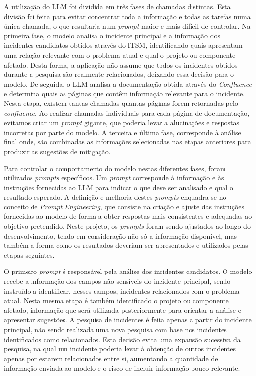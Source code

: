 		A utilização do \gls{LLM} foi dividida em três fases de chamadas distintas. Esta divisão foi feita para evitar concentrar toda a informação e todas as tarefas numa única chamada, o que resultaria num \textit{prompt} maior e mais difícil de controlar. Na primeira fase, o modelo analisa o incidente principal e a informação dos incidentes candidatos obtidos através do \gls{ITSM}, identificando quais apresentam uma relação relevante com o problema atual e qual o projeto ou componente afetado. Desta forma, a aplicação não assume que todos os incidentes obtidos durante a pesquisa são realmente relacionados, deixando essa decisão para o modelo. De seguida, o \gls{LLM} analisa a documentação obtida através do \textit{Confluence} e determina quais as páginas que contêm informação relevante para o incidente. Nesta etapa, existem tantas chamadas quantas páginas forem retornadas pelo \textit{confluence}. Ao realizar chamadas individuais para cada página de documentação, evitamos criar um \textit{prompt} gigante, que poderia levar a alucinações e respostas incorretas por parte do modelo. A terceira e última fase, corresponde à análise final onde, são combinadas as informações selecionadas nas etapas anteriores para produzir as sugestões de mitigação.
		
		Para controlar o comportamento do modelo nestas diferentes fases, foram utilizados \textit{prompts} específicos. Um \textit{prompt} corresponde à informação e às instruções fornecidas ao \gls{LLM} para indicar o que deve ser analisado e qual o resultado esperado. A definição e melhoria destes \textit{prompts} enquadra-se no conceito de \textit{Prompt Engineering}, que consiste na criação e ajuste das instruções fornecidas ao modelo de forma a obter respostas mais consistentes e adequadas ao objetivo pretendido. Neste projeto, os \textit{prompts} foram sendo ajustados ao longo do desenvolvimento, tendo em consideração não só a informação disponível, mas também a forma como os resultados deveriam ser apresentados e utilizados pelas etapas seguintes.
		
		O primeiro \textit{prompt} é responsável pela análise dos incidentes candidatos. O modelo recebe a informação dos campos não sensíveis do incidente principal, sendo instruído a identificar, nesses campos, incidentes relacionados com o problema atual. Nesta mesma etapa é também identificado o projeto ou componente afetado, informação que será utilizada posteriormente para orientar a análise e apresentar sugestões. A pesquisa de incidentes é feita apenas a partir do incidente principal, não sendo realizada uma nova pesquisa com base nos incidentes identificados como relacionados. Esta decisão evita uma expansão sucessiva da pesquisa, na qual um incidente poderia levar à obtenção de outros incidentes apenas por estarem relacionados entre si, aumentando a quantidade de informação enviada ao modelo e o risco de incluir informação pouco relevante.
		

